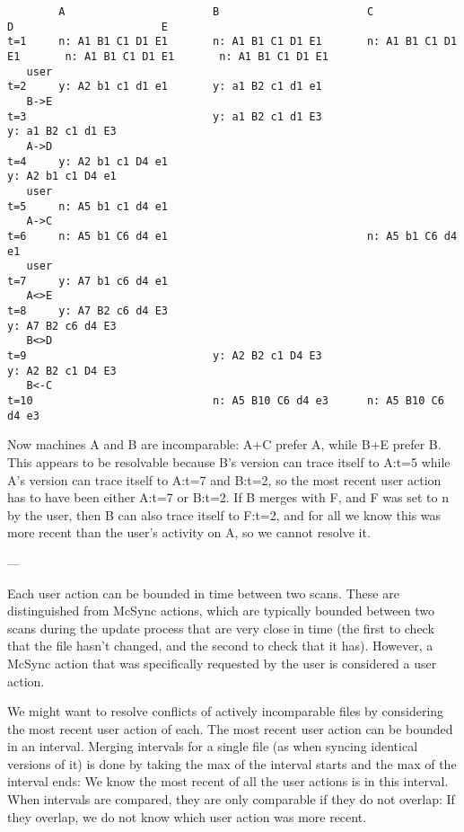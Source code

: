 \documentclass{book}
\begin{document}
\begin{verbatim}
        A                       B                       C                       D                       E
t=1     n: A1 B1 C1 D1 E1       n: A1 B1 C1 D1 E1       n: A1 B1 C1 D1 E1       n: A1 B1 C1 D1 E1       n: A1 B1 C1 D1 E1
   user
t=2     y: A2 b1 c1 d1 e1       y: a1 B2 c1 d1 e1
   B->E
t=3                             y: a1 B2 c1 d1 E3                                                       y: a1 B2 c1 d1 E3
   A->D
t=4     y: A2 b1 c1 D4 e1                                                       y: A2 b1 c1 D4 e1
   user
t=5     n: A5 b1 c1 d4 e1
   A->C
t=6     n: A5 b1 C6 d4 e1                               n: A5 b1 C6 d4 e1
   user
t=7     y: A7 b1 c6 d4 e1
   A<>E
t=8     y: A7 B2 c6 d4 E3                                                                               y: A7 B2 c6 d4 E3
   B<>D
t=9                             y: A2 B2 c1 D4 E3                               y: A2 B2 c1 D4 E3
   B<-C
t=10                            n: A5 B10 C6 d4 e3      n: A5 B10 C6 d4 e3
\end{verbatim}
Now machines A and B are incomparable: A+C prefer A, while B+E prefer B.  This appears to be resolvable because B's version can trace itself to A:t=5 while A's version can trace itself to A:t=7 and B:t=2, so the most recent user action has to have been either A:t=7 or B:t=2.  If B merges with F, and F was set to n by the user, then B can also trace itself to F:t=2, and for all we know this was more recent than the user's activity on A, so we cannot resolve it.

---

Each user action can be bounded in time between two scans.  These are distinguished from McSync actions, which are typically bounded between two scans during the update process that are very close in time (the first to check that the file hasn't changed, and the second to check that it has).  However, a McSync action that was specifically requested by the user is considered a user action.

We might want to resolve conflicts of actively incomparable files by considering the most recent user action of each.  The most recent user action can be bounded in an interval.  Merging intervals for a single file (as when syncing identical versions of it) is done by taking the max of the interval starts and the max of the interval ends: We know the most recent of all the user actions is in this interval.  When intervals are compared, they are only comparable if they do not overlap: If they overlap, we do not know which user action was more recent.
\end{document}
